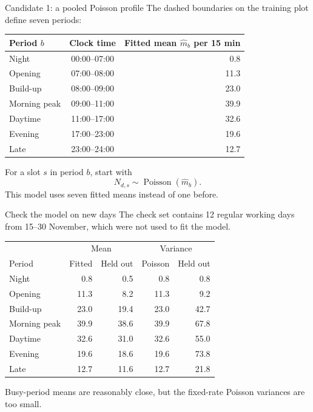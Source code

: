 \documentclass{beamer}
\begin{document}
\begin{frame}{Candidate 1: a pooled Poisson profile}
  The dashed boundaries on the training plot define seven periods:
  \vspace{0.35em}

  \centering
  \small
  \begin{tabular}{@{}lcr@{}}
    \toprule
    Period $b$ & Clock time & Fitted mean $\widehat m_b$ per 15 min\\
    \midrule
    Night & 00:00--07:00 & 0.8\\
    Opening & 07:00--08:00 & 11.3\\
    Build-up & 08:00--09:00 & 23.0\\
    Morning peak & 09:00--11:00 & 39.9\\
    Daytime & 11:00--17:00 & 32.6\\
    Evening & 17:00--23:00 & 19.6\\
    Late & 23:00--24:00 & 12.7\\
    \bottomrule
  \end{tabular}

  \raggedright
  \normalsize
  \vspace{0.5em}
  For a slot $s$ in period $b$, start with
  \[
    N_{d,s}\sim\operatorname{Poisson}(\widehat m_b).
  \]
  This model uses seven fitted means instead of one before.
\end{frame}

\begin{frame}{Check the model on new days}
  \footnotesize
  The check set contains 12 regular working days from 15--30 November, which were not used to fit the model. 
  \centering
  \small
  \begin{tabular}{@{}lrrrr@{}}
    \toprule
      & \multicolumn{2}{c}{Mean} & \multicolumn{2}{c}{Variance}\\
    Period & Fitted & Held out & Poisson & Held out\\
    \midrule
    Night & 0.8 & 0.5 & 0.8 & 0.8\\
    Opening & 11.3 & 8.2 & 11.3 & 9.2\\
    Build-up & 23.0 & 19.4 & 23.0 & 42.7\\
    Morning peak & 39.9 & 38.6 & 39.9 & 67.8\\
    Daytime & 32.6 & 31.0 & 32.6 & 55.0\\
    Evening & 19.6 & 18.6 & 19.6 & 73.8\\
    Late & 12.7 & 11.6 & 12.7 & 21.8\\
    \bottomrule
  \end{tabular}
  \raggedright
  \vspace{0.5cm}
  
  Busy-period means are reasonably close, but the fixed-rate Poisson variances are too small.
\end{frame}
\end{document}
